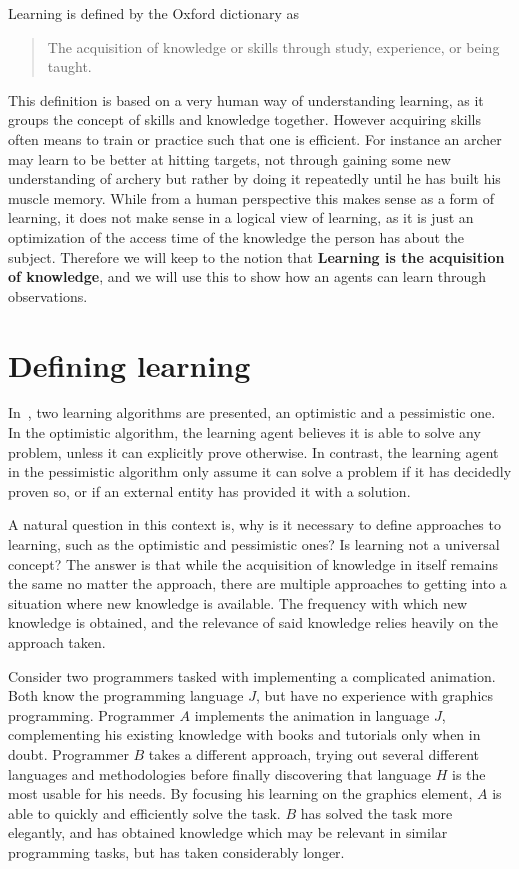 \documentclass[\master/Master.tex]{subfiles}
\begin{document}
	
	Learning is defined by the Oxford dictionary as 
	\begin{quote}
		The acquisition of knowledge or skills through study, experience, or being taught.
	\end{quote}
	
	This definition is based on a very human way of understanding learning, as it groups the concept of skills and knowledge together.
	However acquiring skills often means to train or practice such that one is efficient. For instance an archer may learn to be better at hitting targets, 
	not through gaining some new understanding of archery but rather by doing it repeatedly until he has built his muscle memory.
	While from a human perspective this makes sense as a form of learning, 
	it does not make sense in a logical view of learning, as it is just an optimization of the access time of the knowledge the person has about the subject.
	Therefore we will keep to the notion that \textbf{Learning is the acquisition of knowledge}, and we will use this to show how an agents can learn through observations.

	
\section{Defining learning}
	
	In~\cite{Walsh2008}, two learning algorithms are presented, an optimistic and a pessimistic one.
    In the optimistic algorithm, the learning agent believes it is able to solve any problem, unless it can explicitly prove otherwise. In contrast, the learning agent in the pessimistic algorithm only assume it can solve a problem if it has decidedly proven so, or if an external entity has provided it with a solution. 

A natural question in this context is, why is it necessary to define approaches to learning, such as the optimistic and pessimistic ones? Is learning not a universal concept? The answer is that while the acquisition of knowledge in itself remains the same no matter the approach, there are multiple approaches to getting into a situation where new knowledge is available. The frequency with which new knowledge is obtained, and the relevance of said knowledge relies heavily on the approach taken.

\begin{example}
    Consider two programmers tasked with implementing a complicated animation. Both know the programming language $J$, but have no experience with graphics programming. Programmer $A$ implements the animation in language $J$, complementing his existing knowledge with books and tutorials only when in doubt. Programmer $B$ takes a different approach, trying out several different languages and methodologies before finally discovering that language $H$ is the most usable for his needs. By focusing his learning on the graphics element, $A$ is able to quickly and efficiently solve the task. $B$ has solved the task more elegantly, and has obtained knowledge which may be relevant in similar programming tasks, but has taken considerably longer.
\end{example}
\end{document}
